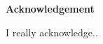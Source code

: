 \begin{center}
\begin{large}
\textbf{Acknowledgement}
\end{large}
\end{center}
I really acknowledge..
